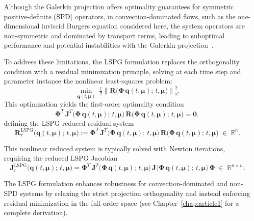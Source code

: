 Although the Galerkin projection offers optimality guarantees for symmetric positive-definite (SPD) operators, in convection-dominated flows, such as the one-dimensional inviscid Burgers equation considered here, the system operators are non-symmetric and dominated by transport terms, leading to suboptimal performance and potential instabilities with the Galerkin projection~\cite{carlberg2011efficient, carlberg2017galerkin}.

To address these limitations, the LSPG formulation replaces the orthogonality condition with a residual minimization principle, solving at each time step and parameter instance the nonlinear least-squares problem:
\begin{equation}
\min_{\mathbf{q}(t,\boldsymbol{\mu})} \; 
\tfrac{1}{2} \left\| 
\mathbf{R}\bigl(\boldsymbol{\Phi}\,\mathbf{q}(t,\boldsymbol{\mu});\,t,\boldsymbol{\mu}\bigr) 
\right\|_2^2.
\end{equation}
This optimization yields the first-order optimality condition
\begin{equation}\label{eq:lspg_residual}
\boldsymbol{\Phi}^{\!T}\,
\mathbf{J}^{\!T}\bigl(\boldsymbol{\Phi}\,\mathbf{q}(t,\boldsymbol{\mu});\,t,\boldsymbol{\mu}\bigr)\,
\mathbf{R}\bigl(\boldsymbol{\Phi}\,\mathbf{q}(t,\boldsymbol{\mu});\,t,\boldsymbol{\mu}\bigr)
= \mathbf{0},
\end{equation}
defining the LSPG reduced residual system
\begin{equation}
\mathbf{R}_{r}^{\text{LSPG}}\bigl(\mathbf{q}(t,\boldsymbol{\mu});\,t,\boldsymbol{\mu}\bigr) 
:= \boldsymbol{\Phi}^{\!T}\,
\mathbf{J}^{\!T}\bigl(\boldsymbol{\Phi}\,\mathbf{q}(t,\boldsymbol{\mu});\,t,\boldsymbol{\mu}\bigr)\,
\mathbf{R}\bigl(\boldsymbol{\Phi}\,\mathbf{q}(t,\boldsymbol{\mu});\,t,\boldsymbol{\mu}\bigr)
\;\in\; \mathbb{R}^n.
\end{equation}

This nonlinear reduced system is typically solved with Newton iterations, requiring the reduced LSPG Jacobian
\begin{equation}\label{eq:lspg_reduced_jacobian}
\mathbf{J}_{r}^{\text{LSPG}}\bigl(\mathbf{q}(t,\boldsymbol{\mu});\,t,\boldsymbol{\mu}\bigr) 
= \boldsymbol{\Phi}^{\!T}\,
\mathbf{J}^{\!T}\bigl(\boldsymbol{\Phi}\,\mathbf{q}(t,\boldsymbol{\mu});\,t,\boldsymbol{\mu}\bigr)\,
\mathbf{J}\bigl(\boldsymbol{\Phi}\,\mathbf{q}(t,\boldsymbol{\mu});\,t,\boldsymbol{\mu}\bigr)\,
\boldsymbol{\Phi}
\;\in\;\mathbb{R}^{n\times n}.
\end{equation}


The LSPG formulation enhances robustness for convection-dominated and non-SPD systems by relaxing the strict projection orthogonality and instead enforcing residual minimization in the full-order space (see Chapter~\ref{chap:article1} for a complete derivation).

